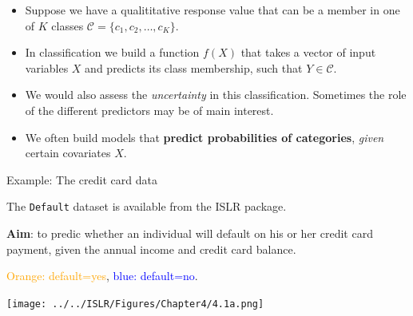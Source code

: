 \documentclass[10pt,ignorenonframetext,]{beamer}
\begin{document}
\begin{frame}

\begin{itemize}
\item
  Suppose we have a qualititative response value that can be a member in
  one of \(K\) classes \(\mathcal{C} = \{c_1, c_2, \ldots , c_K\}\).
\item
  In classification we build a function \(f(X)\) that takes a vector of
  input variables \(X\) and predicts its class membership, such that
  \(Y \in \mathcal{C}\).
\item
  We would also assess the \emph{uncertainty} in this classification.
  Sometimes the role of the different predictors may be of main
  interest.
\item
  We often build models that \textbf{predict probabilities of
  categories}, \emph{given} certain covariates \(X\).
\end{itemize}

\end{frame}

\begin{frame}[fragile]

\begin{block}{Example: The credit card data}

\vspace{2mm}

The \texttt{Default} dataset is available from the ISLR package.

\vspace{2mm}
{\bf Aim}: to predic whether an individual will default on his or her
credit card payment, given the annual income and credit card balance.

\textcolor{orange}{Orange: default=yes},
\textcolor{blue}{blue: default=no}.

\vspace{0mm} \centering
\texttt{[image: ../../ISLR/Figures/Chapter4/4.1a.png]}

\end{block}

\end{frame}
\end{document}
